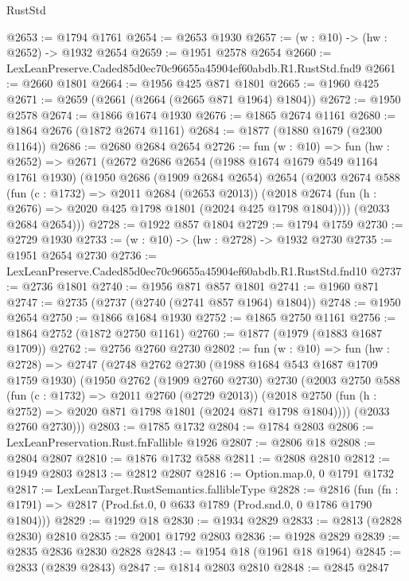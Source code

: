 \begin{lexlean}{RustStd}
\begin{coremodule}
@2653 := @1794 @1761
@2654 := @2653 @1930
@2657 := (w : @10) -> (hw : @2652) -> @1932 @2654
@2659 := @1951 @2578 @2654
@2660 := LexLeanPreserve.Caded85d0ec70c96655a45904ef60abdb.R1.RustStd.fnd9
@2661 := @2660 @1801
@2664 := @1956 @425 @871 @1801
@2665 := @1960 @425
@2671 := @2659 (@2661 (@2664 (@2665 @871 @1964) @1804))
@2672 := @1950 @2578
@2674 := @1866 @1674 @1930
@2676 := @1865 @2674 @1161
@2680 := @1864 @2676 (@1872 @2674 @1161)
@2684 := @1877 (@1880 @1679 (@2300 @1164))
@2686 := @2680 @2684 @2654
@2726 := fun (w : @10) =>
  fun (hw : @2652) =>
  @2671
    (@2672
      @2686
      @2654
      (@1988 @1674 @1679 @549 @1164 @1761 @1930)
      (@1950
        @2686
        (@1909 @2684 @2654)
        @2654
        (@2003
          @2674
          @588
          (fun (c : @1732) => @2011 @2684 (@2653 @2013))
          (@2018 @2674 (fun (h : @2676) => @2020 @425 @1798 @1801 (@2024 @425 @1798 @1804))))
        (@2033 @2684 @2654)))
@2728 := @1922 @857 @1804
@2729 := @1794 @1759
@2730 := @2729 @1930
@2733 := (w : @10) -> (hw : @2728) -> @1932 @2730
@2735 := @1951 @2654 @2730
@2736 := LexLeanPreserve.Caded85d0ec70c96655a45904ef60abdb.R1.RustStd.fnd10
@2737 := @2736 @1801
@2740 := @1956 @871 @857 @1801
@2741 := @1960 @871
@2747 := @2735 (@2737 (@2740 (@2741 @857 @1964) @1804))
@2748 := @1950 @2654
@2750 := @1866 @1684 @1930
@2752 := @1865 @2750 @1161
@2756 := @1864 @2752 (@1872 @2750 @1161)
@2760 := @1877 (@1979 (@1883 @1687 @1709))
@2762 := @2756 @2760 @2730
@2802 := fun (w : @10) =>
  fun (hw : @2728) =>
  @2747
    (@2748
      @2762
      @2730
      (@1988 @1684 @543 @1687 @1709 @1759 @1930)
      (@1950
        @2762
        (@1909 @2760 @2730)
        @2730
        (@2003
          @2750
          @588
          (fun (c : @1732) => @2011 @2760 (@2729 @2013))
          (@2018 @2750 (fun (h : @2752) => @2020 @871 @1798 @1801 (@2024 @871 @1798 @1804))))
        (@2033 @2760 @2730)))
@2803 := @1785 @1732
@2804 := @1784 @2803
@2806 := LexLeanPreservation.Rust.fnFallible @1926
@2807 := @2806 @18
@2808 := @2804 @2807
@2810 := @1876 @1732 @588
@2811 := @2808 @2810
@2812 := @1949 @2803
@2813 := @2812 @2807
@2816 := Option.map.{0, 0} @1791 @1732
@2817 := LexLeanTarget.RustSemantics.fallibleType
@2828 := @2816
    (fun (fn : @1791) => @2817 (Prod.fst.{0, 0} @633 @1789 (Prod.snd.{0, 0} @1786 @1790 @1804)))
@2829 := @1929 @18
@2830 := @1934 @2829
@2833 := @2813 (@2828 @2830) @2810
@2835 := @2001 @1792 @2803
@2836 := @1928 @2829
@2839 := @2835 @2836 @2830 @2828
@2843 := @1954 @18 (@1961 @18 @1964)
@2845 := @2833 (@2839 @2843)
@2847 := @1814 @2803 @2810
@2848 := @2845 @2847

\end{coremodule}
\end{lexlean}
